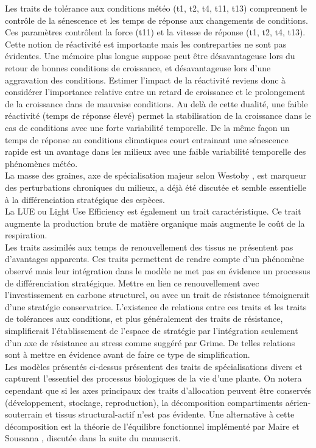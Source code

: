 \documentclass[french]{article}
\begin{document}
{\indent Les traits de tolérance aux conditions météo (t1, t2, t4, t11, t13) comprennent le contrôle de la sénescence et les temps de réponse aux changements de conditions. Ces paramètres contrôlent la force (t11) et la vitesse de réponse (t1, t2, t4, t13). Cette notion de réactivité est importante mais les contreparties ne sont pas évidentes. Une mémoire plus longue suppose peut être désavantageuse lors du retour de bonnes conditions de croissance, et désavantageuse lors d'une aggravation des conditions. Estimer l'impact de la réactivité reviens donc à considérer l'importance relative entre un retard de croissance et le prolongement de la croissance dans de mauvaise conditions. Au delà de cette dualité, une faible réactivité (temps de réponse élevé) permet la stabilisation de la croissance dans le cas de conditions avec une forte variabilité temporelle. De la même façon un temps de réponse au conditions climatiques court entrainant une sénescence rapide est un avantage dans les milieux avec une faible variabilité temporelle des phénomènes météo.\\

\indent La masse des graines, axe de spécialisation majeur selon Westoby \cite{Westoby1998}, est marqueur des perturbations chroniques du milieux, a déjà été discutée et semble essentielle à la différenciation stratégique des espèces.\\

\indent La LUE ou Light Use Efficiency est également un trait caractéristique. Ce trait augmente la production brute de matière organique mais augmente le coût de la respiration.\\

\indent Les traits assimilés aux temps de renouvellement des tissus ne présentent pas d'avantages apparents. Ces traits permettent de rendre compte d'un phénomène observé mais leur intégration dans le modèle ne met pas en évidence un processus de différenciation stratégique. Mettre en lien ce renouvellement avec l'investissement en carbone structurel, ou avec un trait de résistance témoignerait d'une stratégie conservatrice. L'existence de relations entre ces traits et les traits de tolérances aux conditions, et plus généralement des traits de résistance, simplifierait l'établissement de l'espace de stratégie par l'intégration seulement d'un axe de résistance au stress comme suggéré par Grime. De telles relations sont à mettre en évidence avant de faire ce type de simplification.\\

\indent Les modèles présentés ci-dessus présentent des traits de spécialisations divers et capturent l'essentiel des processus biologiques de la vie d'une plante. On notera cependant que si les axes principaux des traits d'allocation peuvent être conservés (développement, stockage, reproduction), la décomposition compartiments aérien-souterrain et tissus structural-actif n'est pas évidente. Une alternative à cette décomposition est la théorie de l'équilibre fonctionnel implémenté par Maire et Soussana \cite{Maire2009,Soussana2012}, discutée dans la suite du manuscrit.



}
\end{document}
